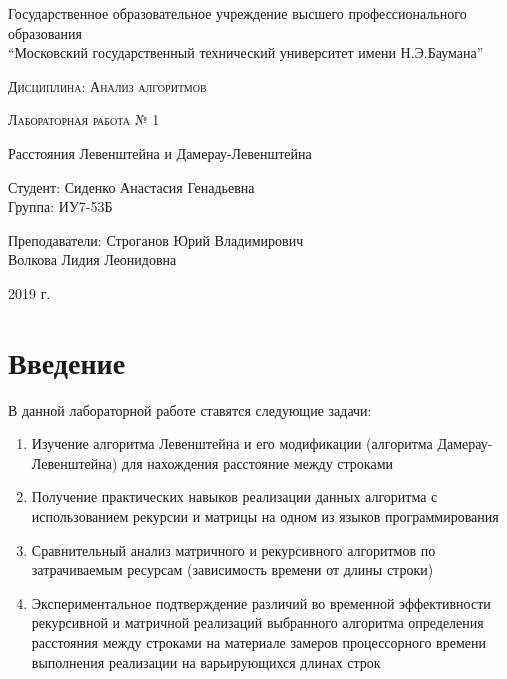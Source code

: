 \documentclass[a4paper,14pt]{article} %
\newcommand{\anonsection}[1]{\section*{#1}\addcontentsline{toc}{section}{#1}}
\begin{document}
	\begin{titlepage}

       		\begin{center}
         		\large
		
        			Государственное образовательное учреждение высшего профессионального образования\\
       			“Московский государственный технический университет имени Н.Э.Баумана”
         		\vspace{3cm}
            
            		\textsc{Дисциплина: Анализ алгоритмов}
           		\vspace{0.5cm}
                
            		\textsc{Лабораторная работа № 1}
           		 \vspace{3cm}
            
           		 \LARGE 
		 
		 	Расстояния Левенштейна и Дамерау-Левенштейна
           		 \vspace{3cm}
            
            		Студент: Сиденко Анастасия Генадьевна \\   
            		Группа: ИУ7-53Б \\
           		\hfill
            
           		Преподаватели: Строганов Юрий Владимирович \\
           		Волкова Лидия Леонидовна
            		\vfill
            		
			\large
            		2019 г.
		\end{center}

	\end{titlepage}
    
	\tableofcontents
	
	\newpage
    
	\anonsection{Введение}
        
        В данной лабораторной работе ставятся следующие задачи:
        \begin{enumerate} 
		\item Изучение алгоритма Левенштейна и его модификации (алгоритма Дамерау-Левенштейна) для нахождения расстояние между строками
		\item Получение практических навыков реализации данных алгоритма с использованием рекурсии и матрицы на одном из языков программирования
		\item Сравнительный анализ матричного и рекурсивного алгоритмов по затрачиваемым ресурсам (зависимость времени от длины строки)
		\item Экспериментальное подтверждение различий во временной эффективности рекурсивной и матричной реализаций выбранного алгоритма определения расстояния между строками на материале замеров процессорного времени выполнения реализации на варьирующихся длинах строк
	\end{enumerate} 
	
\end{document}
